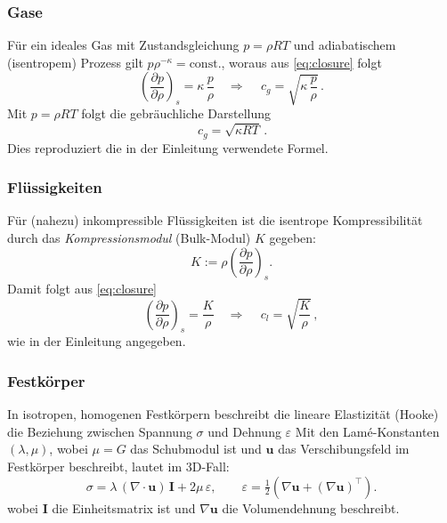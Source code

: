 \subsubsection*{Gase}
Für ein ideales Gas mit Zustandsgleichung $p=\rho R T$ und adiabatischem (isentropem) Prozess gilt $p\rho^{-\kappa}=\mathrm{const.}$, woraus aus \eqref{eq:closure} folgt
\begin{equation}
    \left(\frac{\partial p}{\partial \rho}\right)_{s}=\kappa\,\frac{p}{\rho}
    \quad\Longrightarrow\quad
    \boxed{\,c_g=\sqrt{\kappa\,\frac{p}{\rho}}\,}.
\end{equation}
Mit $p=\rho R T$ folgt die gebräuchliche Darstellung
\begin{equation}
    \boxed{\,c_g=\sqrt{\kappa R T}\,}.
\end{equation}
Dies reproduziert die in der Einleitung verwendete Formel.

\subsubsection*{Flüssigkeiten}
Für (nahezu) inkompressible Flüssigkeiten ist die isentrope Kompressibilität durch das \emph{Kompressionsmodul} (Bulk-Modul) $K$ gegeben:
\begin{equation}
    K := \rho\left(\frac{\partial p}{\partial \rho}\right)_{s}.
\end{equation}
Damit folgt aus \eqref{eq:closure}
\begin{equation}
    \left(\frac{\partial p}{\partial \rho}\right)_{s}=\frac{K}{\rho}
    \quad\Longrightarrow\quad
    \boxed{\,c_l=\sqrt{\frac{K}{\rho}}\,},
\end{equation}
wie in der Einleitung angegeben.

\subsubsection*{Festkörper}
In isotropen, homogenen Festkörpern beschreibt die lineare Elastizität (Hooke) die Beziehung zwischen Spannung $\sigma$ und Dehnung $\varepsilon$
Mit den Lamé-Konstanten $(\lambda,\mu)$, wobei $\mu=G$ das Schubmodul ist und $\mathbf{u}$ das Verschibungsfeld im Festkörper beschreibt, lautet im 3D-Fall:
\begin{equation}
    \sigma = \lambda\,(\nabla\!\cdot\! \mathbf{u})\,\mathbf{I} + 2\mu\,\varepsilon,
    \qquad \varepsilon=\tfrac{1}{2}\left(\nabla\mathbf{u}+(\nabla\mathbf{u})^{\!\top}\right).
\end{equation}
wobei $\mathbf{I}$ die Einheitsmatrix ist und $\nabla\mathbf{u}$ die Volumendehnung beschreibt.

